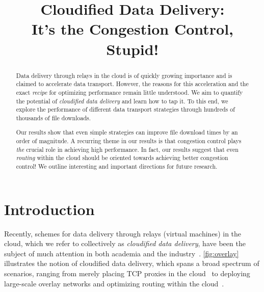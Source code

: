 \documentclass{hotnets17}
\title{Cloudified Data Delivery: \\ It's the Congestion Control, Stupid! }
\author{} %
\date{}
\begin{document}
\maketitle
\sloppypar
    
\begin{abstract}
Data delivery through relays in the cloud is of quickly growing importance and is claimed to accelerate data transport. However, the reasons for this acceleration and the exact \textit{recipe} for optimizing performance remain little understood. We aim to quantify the potential of \textit{cloudified data delivery} and learn how to tap it. To this end, we explore the performance of different data transport strategies through hundreds of thousands of file downloads. 

Our results show that even simple strategies can improve file download times by an order of magnitude. A recurring theme in our results is that congestion control plays \emph{the} crucial role in achieving high performance. In fact, our results suggest that even \emph{routing} within the cloud should be oriented towards achieving better congestion control! We outline interesting and important directions for future research.
\end{abstract}

\section{Introduction}

Recently, schemes for data delivery through relays (virtual machines) in the cloud, which we refer to collectively as \emph{cloudified data delivery}, have been the subject of much attention in both academia and the industry~\cite{cgn2017,CRONets,wang2013accelerating,teridion,akamai}. \autoref{fig:overlay} illustrates the notion of cloudified data delivery, which spans a broad spectrum of scenarios, ranging from merely placing TCP proxies in the cloud~\cite{cgn2017} to deploying large-scale overlay networks and optimizing routing within the cloud~\cite{teridion,CRONets}.

\end{document}
